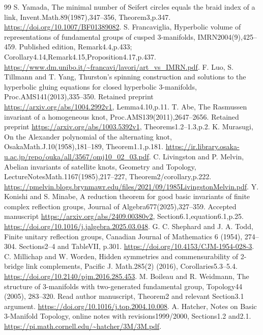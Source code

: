 \documentclass[11pt]{article}
\begin{document}
{\begin{thebibliography}{99}
 S. Yamada,
The minimal number of Seifert circles equals the braid index of a link,
Invent.Math.89(1987),347--356, Theorem3,p.347.
\url{https://doi.org/10.1007/BF01389082}.
 S. Francaviglia,
Hyperbolic volume of representations of fundamental groups of cusped
3-manifolds, IMRN2004(9),425--459. Published edition,
Remark4.4,p.433; Corollary4.14,Remark4.15,Proposition4.17,p.437.
\url{https://www.dm.unibo.it/~francavi/lavori/art_vs_IMRN.pdf}.
 F. Luo, S. Tillmann and T. Yang,
Thurston's spinning construction and solutions to the hyperbolic gluing
equations for closed hyperbolic 3-manifolds, Proc.AMS141(2013),335--350.
Retained preprint \url{https://arxiv.org/abs/1004.2992v1}, Lemma4.10,p.11.
 T. Abe, The Rasmussen invariant of a homogeneous knot,
Proc.AMS139(2011),2647--2656. Retained preprint
\url{https://arxiv.org/abs/1003.5392v1}, Theorems1.2--1.3,p.2.
 K. Murasugi,
On the Alexander polynomial of the alternating knot,
OsakaMath.J.10(1958),181--189, Theorem1.1,p.181.
\url{https://ir.library.osaka-u.ac.jp/repo/ouka/all/3567/omj10_02_03.pdf}.
 C. Livingston and P. Melvin,
Abelian invariants of satellite knots, Geometry and Topology,
LectureNotesMath.1167(1985),217--227, Theorem2/corollary,p.222.
\url{https://pmelvin.blogs.brynmawr.edu/files/2021/09/1985LivingstonMelvin.pdf}.
 Y. Konishi and S. Minabe,
A reduction theorem for good basic invariants of finite complex reflection
groups, Journal of Algebra677(2025),327--359. Accepted manuscript
\url{https://arxiv.org/abs/2409.00380v2}, Section6.1,equation6.1,p.25.
\url{https://doi.org/10.1016/j.jalgebra.2025.03.048}.
 G. C. Shephard and J. A. Todd,
Finite unitary reflection groups, Canadian Journal of Mathematics 6
(1954), 274--304. Sections2--4 and TableVII, p.301.
\url{https://doi.org/10.4153/CJM-1954-028-3}.
\setlength{\itemsep}{2pt}
\small
\setlength{\baselineskip}{11pt}
\setlength{\itemsep}{0pt}
 C. Millichap and W. Worden, Hidden symmetries and
commensurability of 2-bridge link complements, Pacific J. Math.285(2)
(2016), Corollaries5.3--5.4.
\url{https://doi.org/10.2140/pjm.2016.285.453}.
 M. Boileau and R. Weidmann, The structure of 3-manifolds
with two-generated fundamental group, Topology44 (2005), 283--320.
Read author manuscript, Theorem2 and relevant Section3.1 argument.
\url{https://doi.org/10.1016/j.top.2004.10.008}.
 A. Hatcher, Notes on Basic 3-Manifold Topology,
online notes with revisions1999/2000, Sections1.2 and2.1.
\url{https://pi.math.cornell.edu/~hatcher/3M/3M.pdf}.

\end{thebibliography}}
\end{document}
